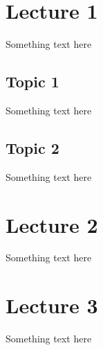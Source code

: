 \documentclass[10pt]{beamer}
\begin{document}
\section{Lecture 1}
\begin{frame}
 Something text here
\end{frame}

\subsection{Topic 1}
\begin{frame}
 Something text here
\end{frame}

\subsection{Topic 2}
\begin{frame}
 Something text here
\end{frame}

\section{Lecture 2}
\begin{frame}
 Something text here
\end{frame}

\section{Lecture 3}
\begin{frame}
 Something text here
\end{frame}
\end{document}
